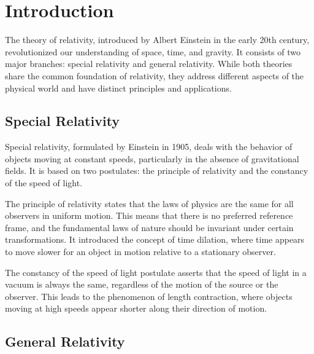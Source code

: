 \documentclass{article}
\begin{document}
\tableofcontents 



\newpage

\section{Introduction}
The theory of relativity, introduced by Albert Einstein in the early 20th century, revolutionized our understanding of space, time, and gravity. It consists of two major branches: special relativity and general relativity. While both theories share the common foundation of relativity, they address different aspects of the physical world and have distinct principles and applications.


\subsection{Special Relativity}
Special relativity, formulated by Einstein in 1905, deals with the behavior of objects moving at constant speeds, particularly in the absence of gravitational fields. It is based on two postulates: the principle of relativity and the constancy of the speed of light.\par
The principle of relativity states that the laws of physics are the same for all observers in uniform motion. This means that there is no preferred reference frame, and the fundamental laws of nature should be invariant under certain transformations. It introduced the concept of time dilation, where time appears to move slower for an object in motion relative to a stationary observer.\par
The constancy of the speed of light postulate asserts that the speed of light in a vacuum is always the same, regardless of the motion of the source or the observer. This leads to the phenomenon of length contraction, where objects moving at high speeds appear shorter along their direction of motion.\par

\subsection{General Relativity}
\end{document}
